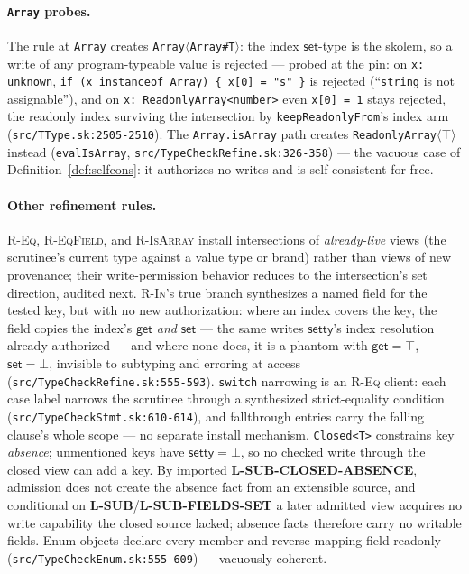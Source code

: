 \documentclass[11pt]{article}
\newcommand{\setty}{\mathsf{setty}}
\begin{document}
\paragraph{\texttt{Array} probes.} The rule at \texttt{Array} creates
\texttt{Array}$\langle$\texttt{Array\#T}$\rangle$: the index
$\mathsf{set}$-type is the skolem, so a write of any program-typeable
value is rejected — probed at the pin: on \texttt{x: unknown},
\texttt{if (x instanceof Array) \{ x[0] = "s" \}} is rejected
(``\texttt{string} is not assignable''), and on
\texttt{x: ReadonlyArray<number>} even \texttt{x[0] = 1} stays
rejected, the readonly index surviving the intersection by
\texttt{keepReadonlyFrom}'s index arm
(\texttt{src/TType.sk:2505-2510}). The \texttt{Array.isArray} path
creates \texttt{ReadonlyArray}$\langle\top\rangle$ instead
(\texttt{evalIsArray}, \texttt{src/TypeCheckRefine.sk:326-358}) — the
vacuous case of Definition~\ref{def:selfcons}: it authorizes no writes and is
self-consistent for free.

\paragraph{Other refinement rules.}
\textsc{R-Eq}, \textsc{R-EqField}, and \textsc{R-IsArray} install
intersections of \emph{already-live} views (the scrutinee's current
type against a value type or brand) rather than views of new
provenance; their write-permission behavior reduces to the intersection's
set direction, audited next. \textsc{R-In}'s true branch synthesizes a
named field for the tested key, but with no new authorization: where an
index covers the key, the field copies the index's $\mathsf{get}$
\emph{and} $\mathsf{set}$ — the same writes $\setty$'s index resolution
already authorized — and where none does, it is a phantom with
$\mathsf{get}=\top$, $\mathsf{set}=\bot$, invisible to subtyping and
erroring at access (\texttt{src/TypeCheckRefine.sk:555-593}).
\texttt{switch} narrowing is an \textsc{R-Eq} client: each case label
narrows the scrutinee through a synthesized strict-equality condition
(\texttt{src/TypeCheckStmt.sk:610-614}), and fallthrough entries carry
the falling clause's whole scope — no separate install mechanism.
\texttt{Closed<T>} constrains key \emph{absence}; unmentioned keys have
$\setty = \bot$, so no checked write through the closed view can add a key.
By imported \textbf{L-SUB-CLOSED-ABSENCE}, admission does not create
the absence fact from an extensible source, and conditional on
\textbf{L-SUB}/\textbf{L-SUB-FIELDS-SET} a later admitted view acquires no
write capability the closed source lacked; absence facts therefore carry
no writable fields. Enum objects declare every member and
reverse-mapping field readonly
(\texttt{src/TypeCheckEnum.sk:555-609}) — vacuously coherent.
\end{document}
